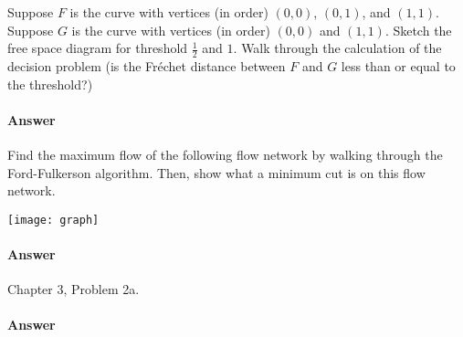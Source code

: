 \documentclass{article}
\begin{document}
\collab{\todo{}}

Suppose $F$ is the curve with vertices (in order) $(0,0)$, $(0,1)$, and $(1,1)$.
Suppose $G$ is the curve with vertices (in order) $(0,0)$ and $(1,1)$.  Sketch
the free space diagram for threshold $\frac{1}{2}$ and $1$.  Walk through the
calculation of the decision problem (is the Fr\'echet distance between $F$ and
$G$ less than or equal to the threshold?)

\paragraph{Answer}


\collab{\todo{}}

Find the maximum flow of the following flow network by walking through the
Ford-Fulkerson algorithm.  Then, show what a minimum cut is on this flow
network.

\vspace{1in}
\texttt{[image: graph]}

\paragraph{Answer}


\collab{\todo{}}

Chapter 3, Problem 2a.

\paragraph{Answer}

\end{document}
